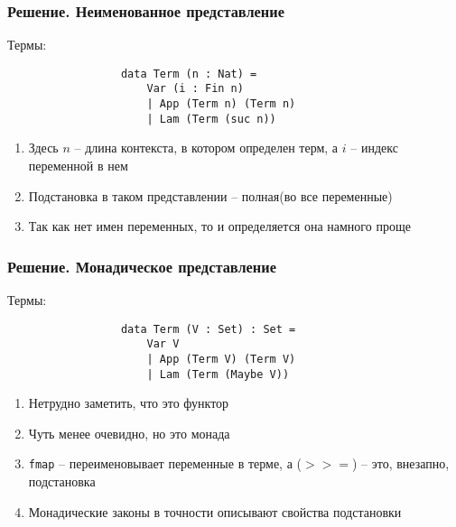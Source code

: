 \documentclass{beamer}
\begin{document}
\begin{frame}[fragile=singleslide]\frametitle{Решение. Неименованное представление}
    Термы:
    \begin{figure}[H]
            \center
            \begin{verbatim}
            data Term (n : Nat) =
                Var (i : Fin n)
                | App (Term n) (Term n)
                | Lam (Term (suc n))
            \end{verbatim}
        \end{figure}
    \begin{enumerate}
        \item Здесь $n$ -- длина контекста, в котором определен терм, а $i$ -- индекс переменной в нем
        \item Подстановка в таком представлении -- полная(во все переменные)
        \item Так как нет имен переменных, то и определяется она намного проще
    \end{enumerate}
\end{frame}


\begin{frame}[fragile=singleslide]\frametitle{Решение. Монадическое представление}
    Термы:
    \begin{figure}[H]
            \center
            \begin{verbatim}
            data Term (V : Set) : Set =
                Var V
                | App (Term V) (Term V)
                | Lam (Term (Maybe V))
            \end{verbatim}
        \end{figure}
    \begin{enumerate}
        \item Нетрудно заметить, что это функтор
        \item Чуть менее очевидно, но это монада
        \item \texttt{fmap} -- переименовывает переменные в терме, а ($>>=$) -- это, внезапно, подстановка
        \item Монадические законы в точности описывают свойства подстановки
    \end{enumerate}
\end{frame}
\end{document}
